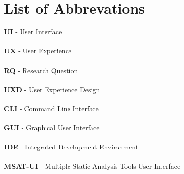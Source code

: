 \chapter{List of Abbrevations}

\textbf{UI} - User Interface \\ \\
\textbf{UX} - User Experience \\ \\
\textbf{RQ} - Research Question \\ \\
\textbf{UXD} - User Experience Design \\ \\
\textbf{CLI} - Command Line Interface \\ \\
\textbf{GUI} - Graphical User Interface \\ \\
\textbf{IDE} - Integrated Development Environment \\ \\
\textbf{MSAT-UI} - Multiple Static Analysis Tools User Interface \\ \\